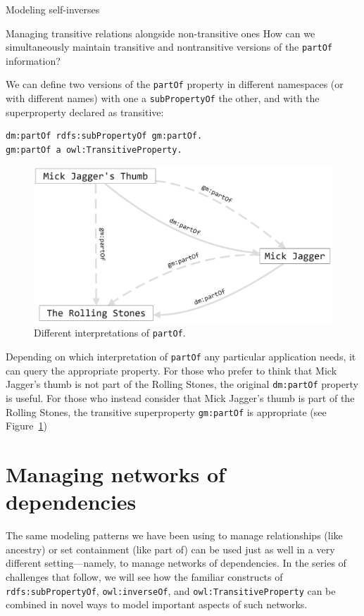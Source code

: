 \begin{challenge}{Modeling self-inverses}
\begin{challenge}{Managing transitive relations alongside non-transitive ones}
\label{chal:18}
How can we simultaneously maintain transitive and nontransitive versions
of the \texttt{partOf} information?

\solution

We can define two versions of the \texttt{partOf} property in different
namespaces (or with different names) with one a \texttt{subPropertyOf} the other,
and with the superproperty declared as transitive:

\begin{lstlisting}
dm:partOf rdfs:subPropertyOf gm:partOf.
gm:partOf a owl:TransitiveProperty.
\end{lstlisting}


\begin{figure}
\centering
\includegraphics[width=5in]{SWWOv3/media/ch9/figure9-5.png}
\caption{Different interpretations of \texttt{partOf}.}
\label{fig:ch9.5}
\end{figure}



Depending on which interpretation of \texttt{partOf} any particular application
needs, it can query the appropriate property. For those who prefer to
think that Mick Jagger's thumb is not part of the Rolling Stones, the
original \texttt{dm:partOf} property is useful. For those who instead consider
that Mick Jagger's thumb is part of the Rolling Stones, the transitive
superproperty \texttt{gm:partOf} is appropriate (see Figure~\ref{fig:ch9.5})
\end{challenge}

\section{Managing networks of dependencies}

The same modeling patterns we have been using to manage relationships
(like ancestry) or set containment (like part of) can be used just as
well in a very different setting---namely, to manage networks of
dependencies. In the series of challenges that follow, we will see how
the familiar constructs of \texttt{rdfs:subPropertyOf}, \texttt{owl:inverseOf}, and
\texttt{owl:TransitiveProperty} can be combined in novel ways to model important
aspects of such networks.


\end{challenge}
